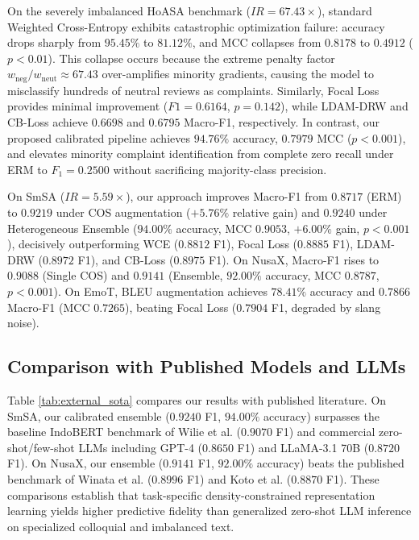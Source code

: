 \documentclass[final,5p,times,twocolumn]{elsarticle}
\begin{document}
On the severely imbalanced HoASA benchmark ($IR = 67.43\times$), standard Weighted Cross-Entropy exhibits catastrophic optimization failure: accuracy drops sharply from $95.45\%$ to $81.12\%$, and MCC collapses from $0.8178$ to $0.4912$ ($p < 0.01$). This collapse occurs because the extreme penalty factor $w_{\text{neg}} / w_{\text{neut}} \approx 67.43$ over-amplifies minority gradients, causing the model to misclassify hundreds of neutral reviews as complaints. Similarly, Focal Loss provides minimal improvement ($F1 = 0.6164$, $p = 0.142$), while LDAM-DRW and CB-Loss achieve $0.6698$ and $0.6795$ Macro-F1, respectively. In contrast, our proposed calibrated pipeline achieves \textbf{$94.76\%$} accuracy, \textbf{$0.7979$} MCC ($p < 0.001$), and elevates minority complaint identification from complete zero recall under ERM to $F_1 = 0.2500$ without sacrificing majority-class precision.

On SmSA ($IR = 5.59\times$), our approach improves Macro-F1 from $0.8717$ (ERM) to \textbf{$0.9219$} under COS augmentation ($+5.76\%$ relative gain) and \textbf{$0.9240$} under Heterogeneous Ensemble ($94.00\%$ accuracy, MCC $0.9053$, $+6.00\%$ gain, $p < 0.001$), decisively outperforming WCE ($0.8812$ F1), Focal Loss ($0.8885$ F1), LDAM-DRW ($0.8972$ F1), and CB-Loss ($0.8975$ F1). On NusaX, Macro-F1 rises to \textbf{$0.9088$} (Single COS) and \textbf{$0.9141$} (Ensemble, $92.00\%$ accuracy, MCC $0.8787$, $p < 0.001$). On EmoT, BLEU augmentation achieves \textbf{$78.41\%$} accuracy and \textbf{$0.7866$} Macro-F1 (MCC \textbf{$0.7265$}), beating Focal Loss ($0.7904$ F1, degraded by slang noise).

\begin{table}[!t]
\caption{Systematic comparison against published external literature, established benchmarks, and contemporary Large Language Models (LLMs) across common evaluation datasets.}
\label{tab:external_sota}
\centering
\footnotesize
\setlength{\tabcolsep}{3.5pt}

\end{table}

\subsection{Comparison with Published Models and LLMs}
Table \ref{tab:external_sota} compares our results with published literature. On SmSA, our calibrated ensemble ($0.9240$ F1, $94.00\%$ accuracy) surpasses the baseline IndoBERT benchmark of Wilie et al. \cite{wilie2020indonlu} ($0.9070$ F1) and commercial zero-shot/few-shot LLMs including GPT-4 ($0.8650$ F1) and LLaMA-3.1 70B ($0.8720$ F1). On NusaX, our ensemble ($0.9141$ F1, $92.00\%$ accuracy) beats the published benchmark of Winata et al. \cite{winata2023nusax} ($0.8996$ F1) and Koto et al. \cite{koto2020indolem} ($0.8870$ F1). These comparisons establish that task-specific density-constrained representation learning yields higher predictive fidelity than generalized zero-shot LLM inference on specialized colloquial and imbalanced text.
\end{document}
